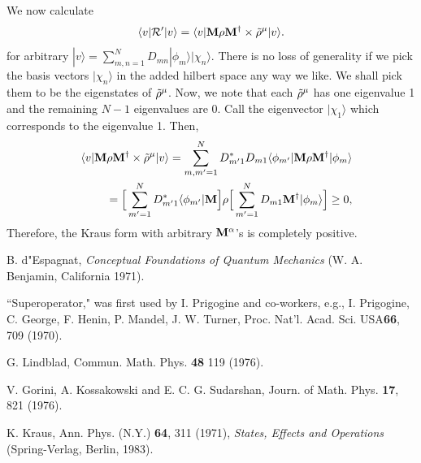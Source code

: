 \documentclass[aps,pra,twocolumn,amssymb, amsfonts,amsmath,showpacs, superscriptaddress]{revtex4}
\begin{document}
\begin{appendix}
We now calculate
\begin{equation}\label{B2}
\langle v|{\cal R}'|v\rangle=\langle v|{\bf M}{\bf\rho}{\bf M}^{\dagger}\times\tilde{\bf\rho}^{\mu}|v\rangle.
\end{equation}
\noindent for arbitrary $|v\rangle=\sum_{m,n=1}^{N}D_{mn}|\phi_{m}\rangle|\chi_{n}\rangle$.  There is no loss of generality if we pick the basis vectors  $|\chi_{n}\rangle$ in the added hilbert space any way we like.  We shall pick them  to be the eigenstates of  
$\tilde{\bf\rho}^{\mu}$. Now, we note that each $\tilde{\bf\rho}^{\mu}$ has one eigenvalue 1 and the remaining $N-1$ eigenvalues are 0.  
 Call the eigenvector  $|\chi_{1}\rangle$ which corresponds to the eigenvalue 1.  Then, 
\begin{eqnarray}\label{B3}
&&\langle v|{\bf M}{\bf \rho}{\bf M}^{\dagger}\times\tilde{\bf\rho}^{\mu}|v\rangle=\sum_{m,m' =1}^{N}
D_{m'1}^{*}D_{m1}\langle \phi_{m'}|{\bf M}{\bf \rho}{\bf M}^{\dagger}|\phi_{m}\rangle\nonumber\\
&&=\Big[\sum_{m' =1}^{N}D_{m'1}^{*}\langle \phi_{m'}|{\bf M}\Big]{\bf\rho}
\Big[\sum_{m' =1}^{N}D_{m1}{\bf M}^{\dagger}| \phi_{m}\rangle\Big]\geq 0,
\end{eqnarray}
\noindent Therefore,  the Kraus form with arbitrary ${\bf M}^{\alpha}$'s is completely positive.


\end{appendix}




\begin{thebibliography}{99}

 B. d"Espagnat, \textit{Conceptual Foundations of Quantum Mechanics} (W. A. Benjamin, California 1971).

 ``Superoperator," was first used by I. Prigogine and co-workers, e.g., I. Prigogine, C. George, F. Henin, P. Mandel, J. W. Turner, Proc. Nat'l. Acad. Sci. USA{\bf 66}, 709 (1970).  

 G. Lindblad, Commun. Math. Phys. {\bf 48} 119 (1976).

 V. Gorini, A. Kossakowski and E. C. G. Sudarshan, Journ. of Math. Phys. {\bf 17}, 821 (1976). 

 K. Kraus, Ann. Phys. (N.Y.) {\bf 64}, 311 (1971), \textit{ States, Effects and Operations} (Spring-Verlag, Berlin, 1983). 


\end{thebibliography}

 
\end{document}
